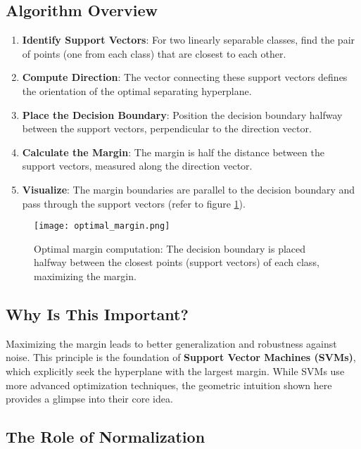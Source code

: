 \subsection{Algorithm Overview}

\begin{enumerate}
    \item \textbf{Identify Support Vectors}: For two linearly separable classes, find the pair of points (one from each class) that are closest to each other.
        \item \textbf{Compute Direction}: The vector connecting these support vectors defines the orientation of the optimal separating hyperplane.
        \item \textbf{Place the Decision Boundary}: Position the decision boundary halfway between the support vectors, perpendicular to the direction vector.
        \item \textbf{Calculate the Margin}: The margin is half the distance between the support vectors, measured along the direction vector.
        \item \textbf{Visualize}: The margin boundaries are parallel to the decision boundary and pass through the support vectors (refer to figure \ref{fig:optimal_margin_glimpse}).
\end{enumerate}
\begin{figure}[htbp]
    \centering
    \texttt{[image: optimal\_margin.png]}
    \caption{Optimal margin computation: The decision boundary is placed halfway between the closest points (support vectors) of each class, maximizing the margin.}
    \label{fig:optimal_margin_glimpse}
\end{figure}
\subsection{Why Is This Important?}

Maximizing the margin leads to better generalization and robustness against noise. This principle is the foundation of \textbf{Support Vector Machines (SVMs)}, which explicitly seek the hyperplane with the largest margin. While SVMs use more advanced optimization techniques, the geometric intuition shown here provides a glimpse into their core idea.




\subsection{The Role of Normalization}

